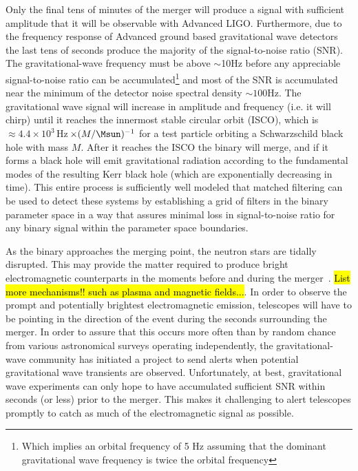 Only the final tens of minutes of the merger will produce a signal with
sufficient amplitude that it will be observable with Advanced LIGO\citeneeded.
Furthermore, due to the frequency response of Advanced ground based
gravitational wave detectors the last tens of seconds produce the majority of
the signal-to-noise ratio (SNR).  The gravitational-wave frequency must be
above $\sim$10Hz  before any appreciable signal-to-noise ratio can be
accumulated\footnote{Which implies an orbital frequency of 5 Hz assuming that
the dominant gravitational wave frequency is twice the orbital frequency} and
most of the SNR is accumulated near the minimum of the detector noise spectral
density $\sim100$Hz.  The gravitational wave signal will increase in amplitude
and frequency (i.e. it will chirp) until it reaches the innermost stable
circular orbit (ISCO), which is $\approx 4.4\times
10^3\,$Hz$\,\times(M/\Msun)^{-1}$ for a test particle orbiting a Schwarzschild
black hole with mass $M$. After it reaches the ISCO the binary will merge, and
if it forms a black hole will emit gravitational radiation according to the
fundamental modes of the resulting Kerr black hole (which are exponentially
decreasing in time)\citeneeded.  This entire process is sufficiently well
modeled that matched filtering can be used to detect these systems by
establishing a grid of filters in the binary parameter space in a way that
assures minimal loss in signal-to-noise ratio for any binary signal within the
parameter space boundaries\citeneeded.

As the binary approaches the merging point, the neutron stars are tidally
disrupted.  This may provide the matter required to produce bright
electromagnetic counterparts in the moments before and during the
merger~\cite{shibata:2007}.   \hl{List more mechanisms!! such as plasma and
magnetic fields...}.  In order to observe the prompt and potentially brightest
electromagnetic emission, telescopes will have to be pointing in the direction
of the event during the seconds surrounding the merger.  In order to assure
that this occurs more often than by random chance from various astronomical
surveys operating independently, the gravitational-wave community has initiated
a project to send alerts when potential gravitational wave transients are
observed.  Unfortunately, at best, gravitational wave experiments can only hope
to have accumulated sufficient SNR within seconds (or less) prior to the merger.
This makes it challenging to alert telescopes promptly to catch as much of
the electromagnetic signal as possible.  

